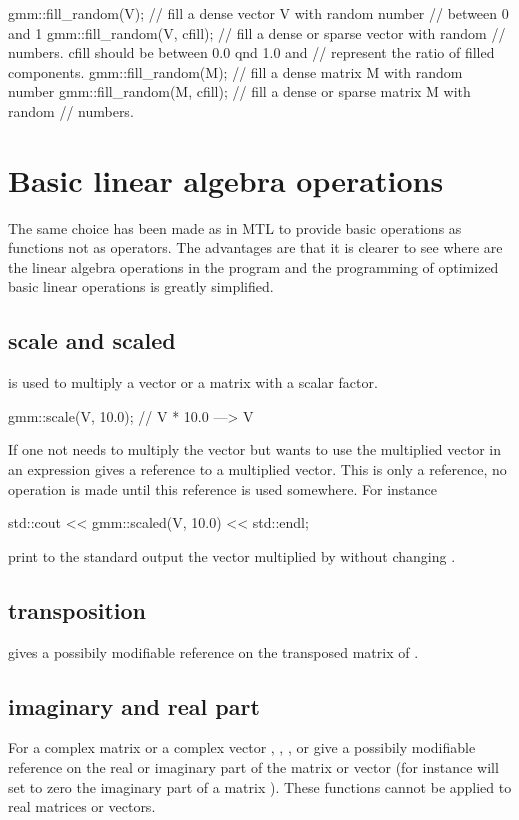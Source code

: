\documentclass[11pt,a4paper]{article}
\begin{document}
\begin{cppcode}
  gmm::fill_random(V); // fill a dense vector V with random number
                       //  between 0 and 1
  gmm::fill_random(V, cfill); // fill a dense or sparse vector with random
                       // numbers. cfill should be between 0.0 qnd 1.0 and
                       // represent the ratio of filled components.
  gmm::fill_random(M); // fill a dense matrix M with random number
  gmm::fill_random(M, cfill); // fill a dense or sparse matrix M with random
                       // numbers.
\end{cppcode}

\section{Basic linear algebra operations}
The same choice has been made as in MTL to provide basic operations as functions not as operators. The advantages are that it is clearer to see where are the linear algebra operations in the program and the programming of optimized basic linear operations is greatly simplified.


\subsection{scale and scaled}
 is used to multiply a vector or a matrix with a scalar factor.
\begin{cppcode}
  gmm::scale(V, 10.0);  // V * 10.0 ---> V
\end{cppcode}
If one not needs to multiply the vector but wants to use the multiplied vector in an expression   gives a reference to a multiplied vector. This is only a reference, no operation is made until this reference is used somewhere. For instance
\begin{cppcode}
  std::cout << gmm::scaled(V, 10.0) << std::endl;
\end{cppcode}
print to the standard output the vector  multiplied by  without changing .

\subsection{transposition}
 gives a possibily modifiable reference on the transposed matrix of .

\subsection{imaginary and real part}
For a complex matrix  or a complex vector , 
, ,  or  give a possibily modifiable reference on the real or imaginary part of the matrix or vector (for instance  will set to zero the imaginary part of a matrix ). These functions cannot be applied to real matrices or vectors.
\end{document}
